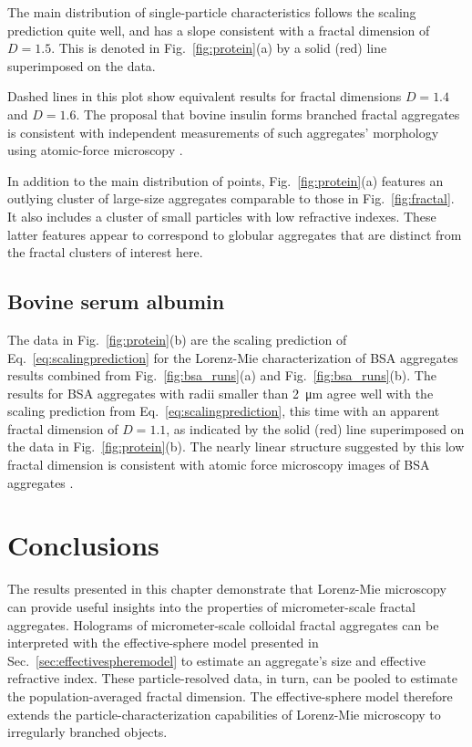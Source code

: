 The main distribution of single-particle characteristics follows the
scaling prediction quite well, and has a slope consistent with
a fractal dimension of $D = \num{1.5}$.  This is denoted in
Fig.~\ref{fig:protein}(a) by a solid (red) line superimposed on the
data.

Dashed lines in this plot show equivalent results for fractal
dimensions $D = \num{1.4}$ and $D = \num{1.6}$.
The proposal that bovine insulin forms branched fractal aggregates
is consistent with independent measurements of such aggregates'
morphology using atomic-force microscopy \cite{siposova12}.

In addition to the main distribution of points,
Fig.~\ref{fig:protein}(a) features an outlying cluster of large-size
aggregates comparable to those in Fig.~\ref{fig:fractal}.
It also includes a cluster of small particles
with low refractive indexes.
These latter features appear to correspond to 
globular aggregates that are distinct from the
fractal clusters of interest here.

\subsection{Bovine serum albumin}

The data in Fig.~\ref{fig:protein}(b) are the scaling prediction of Eq.~\eqref{eq:scalingprediction} for the Lorenz-Mie characterization of BSA aggregates results combined from Fig.~\ref{fig:bsa_runs}(a) and Fig.~\ref{fig:bsa_runs}(b).
The results for BSA aggregates with radii smaller than \SI{2}{\um}
agree well with the scaling prediction from
Eq.~\eqref{eq:scalingprediction},
this time with an apparent fractal dimension of $D = \num{1.1}$,
as indicated by the solid (red) line superimposed on the
data in Fig.~\ref{fig:protein}(b).
The nearly linear structure suggested by this low fractal dimension
is consistent with atomic force microscopy images of 
BSA aggregates \cite{omichi14}.

\section{Conclusions}

The results 
presented in this chapter demonstrate that Lorenz-Mie microscopy can provide useful insights
into the properties of micrometer-scale fractal aggregates.
Holograms of micrometer-scale colloidal fractal
aggregates can be interpreted with
the effective-sphere model presented in
Sec.~\ref{sec:effectivespheremodel}
to estimate an aggregate's size
and effective refractive index.
These particle-resolved data, in turn, can be pooled
to estimate the population-averaged fractal dimension.
The effective-sphere model therefore extends
the particle-characterization capabilities of
Lorenz-Mie microscopy to irregularly branched
objects.

